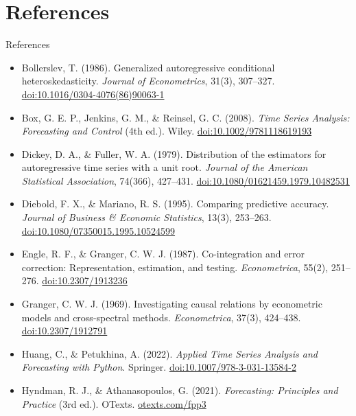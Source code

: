 \section{References}

\begin{frame}{References}
\itemsize{\tiny}
\begin{itemize}
    \item Bollerslev, T. (1986). Generalized autoregressive conditional heteroskedasticity. \textit{Journal of Econometrics}, 31(3), 307--327. \href{https://doi.org/10.1016/0304-4076(86)90063-1}{doi:10.1016/0304-4076(86)90063-1}
    \item Box, G. E. P., Jenkins, G. M., \& Reinsel, G. C. (2008). \textit{Time Series Analysis: Forecasting and Control} (4th ed.). Wiley. \href{https://doi.org/10.1002/9781118619193}{doi:10.1002/9781118619193}
    \item Dickey, D. A., \& Fuller, W. A. (1979). Distribution of the estimators for autoregressive time series with a unit root. \textit{Journal of the American Statistical Association}, 74(366), 427--431. \href{https://doi.org/10.1080/01621459.1979.10482531}{doi:10.1080/01621459.1979.10482531}
    \item Diebold, F. X., \& Mariano, R. S. (1995). Comparing predictive accuracy. \textit{Journal of Business \& Economic Statistics}, 13(3), 253--263. \href{https://doi.org/10.1080/07350015.1995.10524599}{doi:10.1080/07350015.1995.10524599}
    \item Engle, R. F., \& Granger, C. W. J. (1987). Co-integration and error correction: Representation, estimation, and testing. \textit{Econometrica}, 55(2), 251--276. \href{https://doi.org/10.2307/1913236}{doi:10.2307/1913236}
    \item Granger, C. W. J. (1969). Investigating causal relations by econometric models and cross-spectral methods. \textit{Econometrica}, 37(3), 424--438. \href{https://doi.org/10.2307/1912791}{doi:10.2307/1912791}
    \item Huang, C., \& Petukhina, A. (2022). \textit{Applied Time Series Analysis and Forecasting with Python}. Springer. \href{https://doi.org/10.1007/978-3-031-13584-2}{doi:10.1007/978-3-031-13584-2}
    \item Hyndman, R. J., \& Athanasopoulos, G. (2021). \textit{Forecasting: Principles and Practice} (3rd ed.). OTexts. \href{https://otexts.com/fpp3/}{otexts.com/fpp3}

\end{itemize}
\end{frame}
